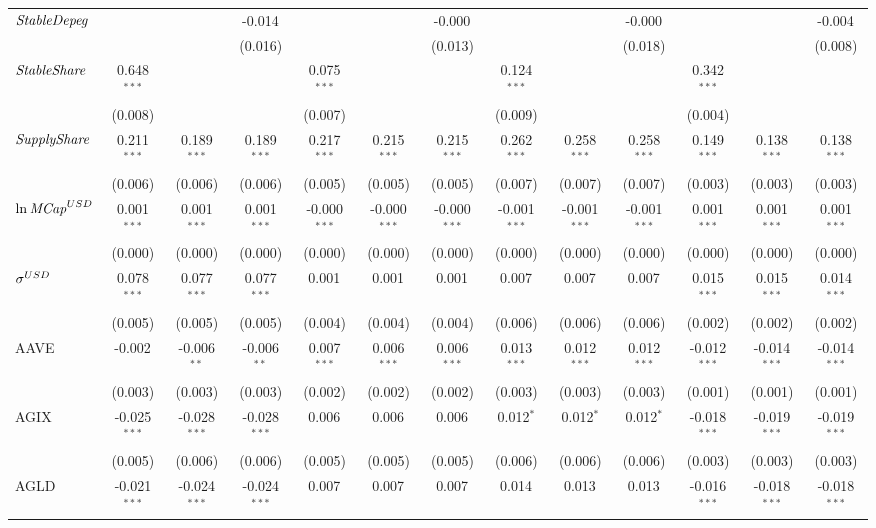 \begin{table}[!htbp]
\begin{tabular}{@{\extracolsep{5pt}}lcccccccccccc}
 ${\it StableDepeg}$ & & & -0.014$^{}$ & & & -0.000$^{}$ & & & -0.000$^{}$ & & & -0.004$^{}$ \\
  & & & (0.016) & & & (0.013) & & & (0.018) & & & (0.008) \\
 ${\it StableShare}$ & 0.648$^{***}$ & & & 0.075$^{***}$ & & & 0.124$^{***}$ & & & 0.342$^{***}$ & & \\
  & (0.008) & & & (0.007) & & & (0.009) & & & (0.004) & & \\
 ${\it SupplyShare}$ & 0.211$^{***}$ & 0.189$^{***}$ & 0.189$^{***}$ & 0.217$^{***}$ & 0.215$^{***}$ & 0.215$^{***}$ & 0.262$^{***}$ & 0.258$^{***}$ & 0.258$^{***}$ & 0.149$^{***}$ & 0.138$^{***}$ & 0.138$^{***}$ \\
  & (0.006) & (0.006) & (0.006) & (0.005) & (0.005) & (0.005) & (0.007) & (0.007) & (0.007) & (0.003) & (0.003) & (0.003) \\
 ${\it \ln MCap}^{USD}$ & 0.001$^{***}$ & 0.001$^{***}$ & 0.001$^{***}$ & -0.000$^{***}$ & -0.000$^{***}$ & -0.000$^{***}$ & -0.001$^{***}$ & -0.001$^{***}$ & -0.001$^{***}$ & 0.001$^{***}$ & 0.001$^{***}$ & 0.001$^{***}$ \\
  & (0.000) & (0.000) & (0.000) & (0.000) & (0.000) & (0.000) & (0.000) & (0.000) & (0.000) & (0.000) & (0.000) & (0.000) \\
 ${\it \sigma}^{USD}$ & 0.078$^{***}$ & 0.077$^{***}$ & 0.077$^{***}$ & 0.001$^{}$ & 0.001$^{}$ & 0.001$^{}$ & 0.007$^{}$ & 0.007$^{}$ & 0.007$^{}$ & 0.015$^{***}$ & 0.015$^{***}$ & 0.014$^{***}$ \\
  & (0.005) & (0.005) & (0.005) & (0.004) & (0.004) & (0.004) & (0.006) & (0.006) & (0.006) & (0.002) & (0.002) & (0.002) \\
 AAVE & -0.002$^{}$ & -0.006$^{**}$ & -0.006$^{**}$ & 0.007$^{***}$ & 0.006$^{***}$ & 0.006$^{***}$ & 0.013$^{***}$ & 0.012$^{***}$ & 0.012$^{***}$ & -0.012$^{***}$ & -0.014$^{***}$ & -0.014$^{***}$ \\
  & (0.003) & (0.003) & (0.003) & (0.002) & (0.002) & (0.002) & (0.003) & (0.003) & (0.003) & (0.001) & (0.001) & (0.001) \\
 AGIX & -0.025$^{***}$ & -0.028$^{***}$ & -0.028$^{***}$ & 0.006$^{}$ & 0.006$^{}$ & 0.006$^{}$ & 0.012$^{*}$ & 0.012$^{*}$ & 0.012$^{*}$ & -0.018$^{***}$ & -0.019$^{***}$ & -0.019$^{***}$ \\
  & (0.005) & (0.006) & (0.006) & (0.005) & (0.005) & (0.005) & (0.006) & (0.006) & (0.006) & (0.003) & (0.003) & (0.003) \\
 AGLD & -0.021$^{***}$ & -0.024$^{***}$ & -0.024$^{***}$ & 0.007$^{}$ & 0.007$^{}$ & 0.007$^{}$ & 0.014$^{}$ & 0.013$^{}$ & 0.013$^{}$ & -0.016$^{***}$ & -0.018$^{***}$ & -0.018$^{***}$ \\

\end{tabular}
\end{table}
